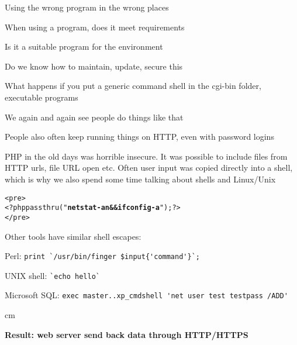 \documentclass[Screen16to9,17pt]{foils}
\begin{document}
\begin{list1}
\item Using the wrong program in the wrong places
\begin{list2}
\item When using a program, does it meet requirements
\item Is it a suitable program for the environment
\item Do we know how to maintain, update, secure this
\end{list2}
\item What happens if you put a generic command shell in the cgi-bin folder, executable programs
\item We again and again see people do things like that
\item People also often keep running things on HTTP, even with password logins
\end{list1}


\begin{list1}
\item PHP in the old days was horrible insecure. It was possible to include files from HTTP urls, file URL open etc. Often user input was copied directly into a shell, which is why we also spend some time talking about shells and Linux/Unix
\end{list1}
\begin{alltt}
<pre>
<?php passthru("{\bf netstat -an && ifconfig -a}"); ?>
</pre>
\end{alltt}
\begin{list1}
\item Other tools have similar shell escapes:
\begin{list2}
\item Perl: \verb+print `/usr/bin/finger $input{'command'}`;+
\item UNIX shell: \verb+`echo hello`+
\item Microsoft SQL: \verb+exec master..xp_cmdshell 'net user test testpass /ADD'+
\end{list2}
\end{list1}

 cm

\centerline{\bf Result: web server send back data through HTTP/HTTPS}


\end{document}
